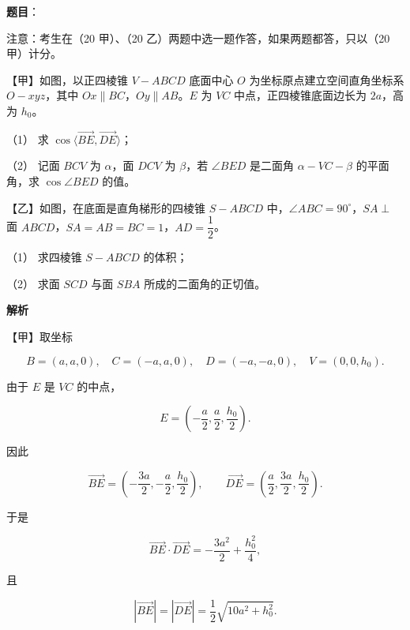 \begin{answer}

\textbf{题目}：

注意：考生在（20 甲）、（20 乙）两题中选一题作答，如果两题都答，只以（20 甲）计分。

【甲】如图，以正四棱锥 $V-ABCD$ 底面中心 $O$ 为坐标原点建立空间直角坐标系 $O-xyz$，其中 $Ox\parallel BC$，$Oy\parallel AB$。$E$ 为 $VC$ 中点，正四棱锥底面边长为 $2a$，高为 $h_0$。
\nopagebreak[4]
\begin{center}\end{center}
\nopagebreak[4]
（1） 求 $\cos\langle\overrightarrow{BE},\overrightarrow{DE}\rangle$；

（2） 记面 $BCV$ 为 $\alpha$，面 $DCV$ 为 $\beta$，若 $\angle BED$ 是二面角 $\alpha-VC-\beta$ 的平面角，求 $\cos\angle BED$ 的值。

【乙】如图，在底面是直角梯形的四棱锥 $S-ABCD$ 中，$\angle ABC=90^\circ$，$SA\perp$ 面 $ABCD$，$SA=AB=BC=1$，$AD=\dfrac12$。
\nopagebreak[4]
\begin{center}\end{center}
\nopagebreak[4]
（1） 求四棱锥 $S-ABCD$ 的体积；

（2） 求面 $SCD$ 与面 $SBA$ 所成的二面角的正切值。

\textbf{解析}


【甲】取坐标

\nopagebreak[4]
\[
B=(a,a,0),\quad C=(-a,a,0),\quad D=(-a,-a,0),\quad V=(0,0,h_0).
\]

由于 $E$ 是 $VC$ 的中点，

\nopagebreak[4]
\[
E=\left(-\frac a2,\frac a2,\frac{h_0}{2}\right).
\]

因此

\nopagebreak[4]
\[
\overrightarrow{BE}=\left(-\frac{3a}{2},-\frac a2,\frac{h_0}{2}\right),
\qquad
\overrightarrow{DE}=\left(\frac a2,\frac{3a}{2},\frac{h_0}{2}\right).
\]

于是

\nopagebreak[4]
\[
\overrightarrow{BE}\cdot\overrightarrow{DE}
=-\frac{3a^2}{2}+\frac{h_0^2}{4},
\]

且

\nopagebreak[4]
\[
|\overrightarrow{BE}|=|\overrightarrow{DE}|
=\frac12\sqrt{10a^2+h_0^2}.
\]


\end{answer}
